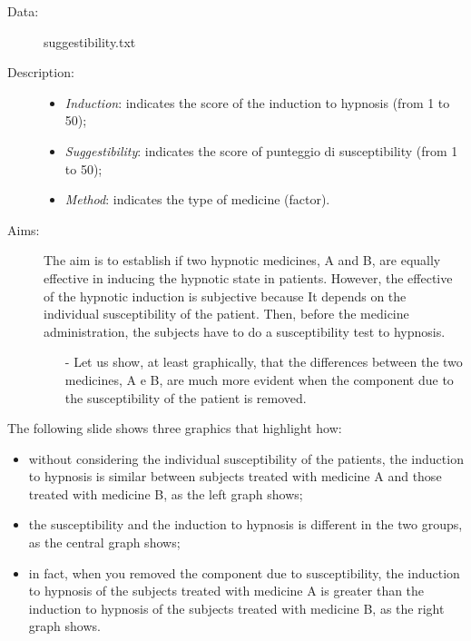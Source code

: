 \begin{frame}
  \begin{description}
    \item[Data: ]suggestibility.txt \\ 
    \item[Description: ]
      \begin{footnotesize}
        \begin{itemize}
          \item \textit{Induction}: indicates the score of the induction to hypnosis (from 1 to 50);
          \item \textit{Suggestibility}: indicates the score of punteggio di susceptibility (from 1 to 50);
          \item \textit{Method}: indicates the type of medicine (factor).
        \end{itemize}
      \end{footnotesize}
    \item[Aims: ]
      \begin{footnotesize}
        The aim is to establish if two hypnotic medicines, A and B, are equally effective in inducing the hypnotic state in patients. However, the effective of the hypnotic induction is subjective because It depends on the individual susceptibility of the patient. Then, before the medicine administration, the subjects have to do a susceptibility test to hypnosis.
        \begin{itemize}
          \item[-] Let us show, at least graphically, that the differences between the two medicines, A e B, are much more evident when the component due to the susceptibility of the patient is removed.
        \end{itemize}
      \end{footnotesize}
  \end{description}
\end{frame}

\begin{frame}
  \vspace{0.5cm}
  The following slide shows three graphics that highlight how:
  \begin{itemize}
    \vspace{0.25cm}
    \item without considering the individual susceptibility of the patients, the induction to hypnosis is similar between subjects treated with medicine A and those treated with medicine B, as the left graph shows;
    \vspace{0.25cm}
    \item the susceptibility and the induction to hypnosis is different in the two groups, as the central graph shows;
    \vspace{0.25cm}
    \item in fact, when you removed the component due to susceptibility, the induction to hypnosis of the subjects treated with medicine A is greater than the induction to hypnosis of the subjects treated with medicine B, as the right graph shows.
  \end{itemize}
\end{frame}

